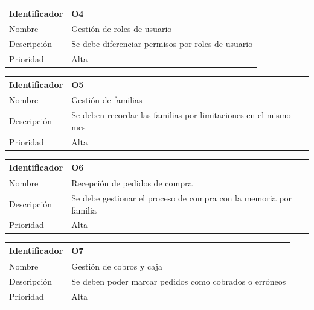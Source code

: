 \vspace{1em}
\par
\begin{tabular}{||p{3cm}|p{11cm}||} 
\hline
Identificador & O4 \\ [0.5ex] 
\hline\hline
Nombre & Gestión de roles de usuario \\ 
\hline
Descripción & Se debe diferenciar permisos por roles de usuario \\
\hline
Prioridad & Alta \\ [1ex] 
\hline
\end{tabular}

\vspace{1em}
\par
\begin{tabular}{||p{3cm}|p{11cm}||} 
\hline
Identificador & O5 \\ [0.5ex] 
\hline\hline
Nombre & Gestión de familias \\ 
\hline
Descripción & Se deben recordar las familias por limitaciones en el mismo mes \\
\hline
Prioridad & Alta \\ [1ex] 
\hline
\end{tabular}

\vspace{1em}
\par
\begin{tabular}{||p{3cm}|p{11cm}||} 
\hline
Identificador & O6 \\ [0.5ex] 
\hline\hline
Nombre & Recepción de pedidos de compra \\ 
\hline
Descripción & Se debe gestionar el proceso de compra con la memoria por familia \\
\hline
Prioridad & Alta \\ [1ex] 
\hline
\end{tabular}


\vspace{1em}
\par
\begin{tabular}{||p{3cm}|p{11cm}||} 
\hline
Identificador & O7 \\ [0.5ex] 
\hline\hline
Nombre & Gestión de cobros y caja \\ 
\hline
Descripción & Se deben poder marcar pedidos como cobrados o erróneos \\
\hline
Prioridad & Alta \\ [1ex] 
\hline
\end{tabular}


